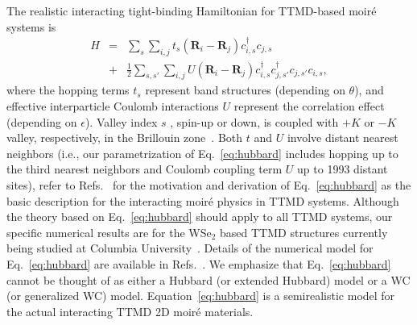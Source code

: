 \documentclass[aps,prl,floatfix,twocolumn]{revtex4-2}
\begin{document}
{The} realistic interacting tight-binding Hamiltonian for TTMD-based moir\'e systems {is}~\cite{pan2020band,pan2020quantum}
\begin{eqnarray}\label{eq:hubbard}
	H&=&\sum_{s}\sum_{i,j}^{} t_{s}\left(\bm{R}_i-\bm{R}_j\right) c_{i,s}^\dagger c_{j,s}\nonumber\\
	&+&\frac{1}{2}\sum_{s,s'}\sum_{i,j}U(\bm{R}_i-\bm{R}_j) c_{i,s}^\dagger c_{j,s'}^\dagger c_{j,s'} c_{i,s},
\end{eqnarray}
where {the hopping terms $t_s$ represent band structures (depending on $\theta$), and effective interparticle Coulomb interactions $ U $  represent the correlation effect (depending on $\epsilon$)}. Valley index $s$ , spin-up or down, is coupled with $+K$  or $-K$  valley, respectively, in the Brillouin zone~\cite{pan2020band}. {Both} $ t $ and $ U $ involve distant nearest neighbors ({i.e., our parametrization of Eq.~\eqref{eq:hubbard} includes hopping up to the third nearest neighbors and Coulomb coupling term $ U $ up to 1993 distant sites}), refer to Refs.~ for the motivation and derivation of Eq.~\eqref{eq:hubbard} as the basic description for the interacting moir\'e physics in TTMD systems.  Although the theory based on Eq.~\eqref{eq:hubbard} should apply to all TTMD systems, our specific numerical results are for the WSe${}_2$ based TTMD structures currently being studied at Columbia University~\cite{wang2020correlated}.  Details of the numerical model for Eq.~\eqref{eq:hubbard} {are available in Refs.}~.  We emphasize that Eq.~\eqref{eq:hubbard} cannot be thought of as either a Hubbard (or extended Hubbard) model or a {WC} (or generalized WC) model. Equation~\eqref{eq:hubbard} is a semirealistic model for the actual interacting TTMD 2D moir\'e materials.
\end{document}
